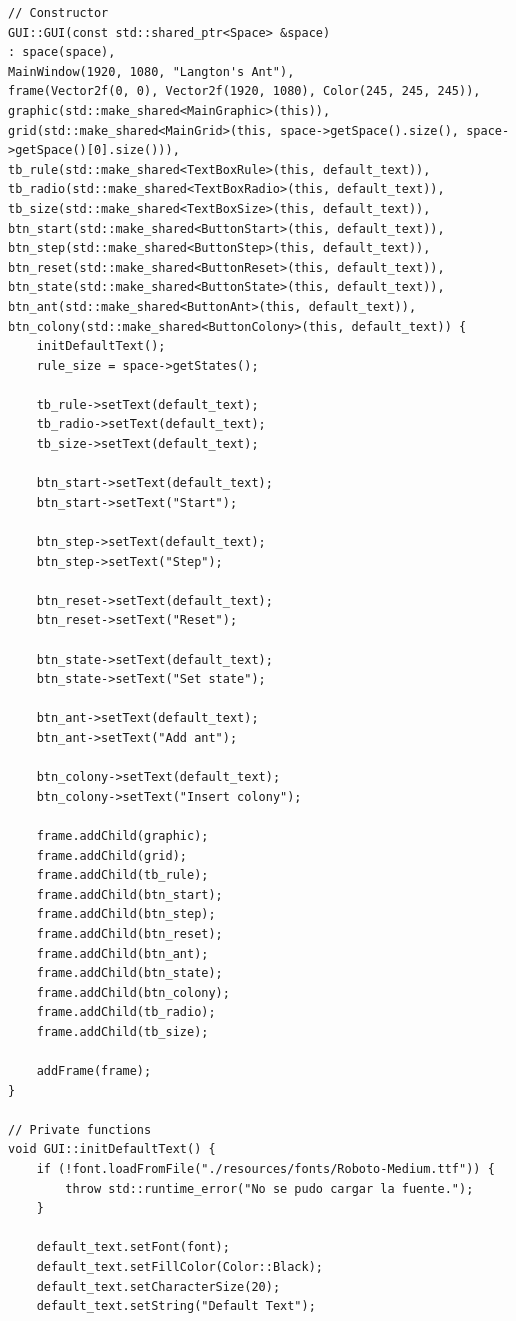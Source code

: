 \documentclass[12pt,twoside]{article}
\begin{document}
\begin{lstlisting}[caption={GUI.cpp}, label={lst:cppexample}]
// Constructor
GUI::GUI(const std::shared_ptr<Space> &space)
: space(space),
MainWindow(1920, 1080, "Langton's Ant"),
frame(Vector2f(0, 0), Vector2f(1920, 1080), Color(245, 245, 245)),
graphic(std::make_shared<MainGraphic>(this)),
grid(std::make_shared<MainGrid>(this, space->getSpace().size(), space->getSpace()[0].size())),
tb_rule(std::make_shared<TextBoxRule>(this, default_text)),
tb_radio(std::make_shared<TextBoxRadio>(this, default_text)),
tb_size(std::make_shared<TextBoxSize>(this, default_text)),
btn_start(std::make_shared<ButtonStart>(this, default_text)),
btn_step(std::make_shared<ButtonStep>(this, default_text)),
btn_reset(std::make_shared<ButtonReset>(this, default_text)),
btn_state(std::make_shared<ButtonState>(this, default_text)),
btn_ant(std::make_shared<ButtonAnt>(this, default_text)),
btn_colony(std::make_shared<ButtonColony>(this, default_text)) {
	initDefaultText();
	rule_size = space->getStates();
	
	tb_rule->setText(default_text);
	tb_radio->setText(default_text);
	tb_size->setText(default_text);
	
	btn_start->setText(default_text);
	btn_start->setText("Start");
	
	btn_step->setText(default_text);
	btn_step->setText("Step");
	
	btn_reset->setText(default_text);
	btn_reset->setText("Reset");
	
	btn_state->setText(default_text);
	btn_state->setText("Set state");
	
	btn_ant->setText(default_text);
	btn_ant->setText("Add ant");
	
	btn_colony->setText(default_text);
	btn_colony->setText("Insert colony");
	
	frame.addChild(graphic);
	frame.addChild(grid);
	frame.addChild(tb_rule);
	frame.addChild(btn_start);
	frame.addChild(btn_step);
	frame.addChild(btn_reset);
	frame.addChild(btn_ant);
	frame.addChild(btn_state);
	frame.addChild(btn_colony);
	frame.addChild(tb_radio);
	frame.addChild(tb_size);
	
	addFrame(frame);
}

// Private functions
void GUI::initDefaultText() {
	if (!font.loadFromFile("./resources/fonts/Roboto-Medium.ttf")) {
		throw std::runtime_error("No se pudo cargar la fuente.");
	}
	
	default_text.setFont(font);
	default_text.setFillColor(Color::Black);
	default_text.setCharacterSize(20);
	default_text.setString("Default Text");
	

\end{lstlisting}
\end{document}
